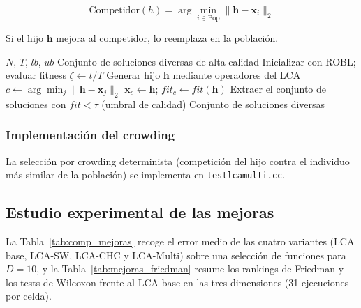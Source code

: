 \begin{equation}
  \text{Competidor}(h) = \arg\min_{i \in \text{Pop}} \|\mathbf{h} - \mathbf{x}_i\|_2
  \label{eq:crowding}
\end{equation}

Si el hijo $\mathbf{h}$ mejora al competidor, lo reemplaza en la población.

\begin{algorithm}[H]
\caption{LCA Multimodal con Crowding Determinista}
\label{alg:lcamulti}
\begin{algorithmic}[1]
\Require $N$, $T$, $lb$, $ub$
\Ensure Conjunto de soluciones diversas de alta calidad
\State Inicializar con ROBL; evaluar fitness
  \State $\zeta \leftarrow t/T$
    \State Generar hijo $\mathbf{h}$ mediante operadores del LCA
    \State $c \leftarrow \arg\min_{j} \|\mathbf{h} - \mathbf{x}_j\|_2$ 
      \State $\mathbf{x}_c \leftarrow \mathbf{h}$; $fit_c \leftarrow fit(\mathbf{h})$ 
    \EndIf
  \EndFor
\EndFor
\State Extraer el conjunto de soluciones con $fit < \tau$ (umbral de calidad)
\State \Return Conjunto de soluciones diversas
\end{algorithmic}
\end{algorithm}

\subsubsection{Implementación del crowding}

La selecci\'on por crowding determinista (competici\'on del hijo contra el individuo m\'as similar de la poblaci\'on) se implementa en \texttt{testlcamulti.cc}.

\subsection{Estudio experimental de las mejoras}

La Tabla~\ref{tab:comp_mejoras} recoge el error medio de las cuatro variantes (LCA base,
LCA-SW, LCA-CHC y LCA-Multi) sobre una selección de funciones para $D=10$, y la
Tabla~\ref{tab:mejoras_friedman} resume los rankings de Friedman y los tests de Wilcoxon
frente al LCA base en las tres dimensiones (31 ejecuciones por celda).

